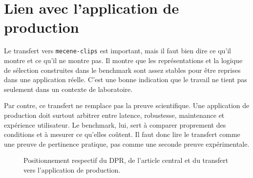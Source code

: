 \section{Lien avec l'application de production}

Le transfert vers \texttt{mecene-clips} est important, mais il faut bien dire ce qu'il montre et ce qu'il ne montre pas. Il montre que les repr\'esentations et la logique de s\'election construites dans le benchmark sont assez stables pour \^etre reprises dans une application r\'eelle. C'est une bonne indication que le travail ne tient pas seulement dans un contexte de laboratoire.

Par contre, ce transfert ne remplace pas la preuve scientifique. Une application de production doit surtout arbitrer entre latence, robustesse, maintenance et exp\'erience utilisateur. Le benchmark, lui, sert \`a comparer proprement des conditions et \`a mesurer ce qu'elles co\^utent. Il faut donc lire le transfert comme une preuve de pertinence pratique, pas comme une seconde preuve exp\'erimentale.

\begin{figure}[ht]
\centering
{}
\ArrowSeparator
{}
\ArrowSeparator
{}
\caption{Positionnement respectif du DPR, de l'article central et du transfert vers l'application de production.}
\label{fig:thesis-positioning}
\end{figure}

